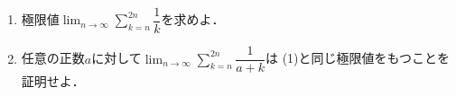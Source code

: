\documentclass[../../main.tex]{subfiles}
\begin{document}
\begin{enumerate}
  \item 極限値$\displaystyle \lim_{n \to \infty} \sum_{k=n}^{2n} \dfrac{1}{k}$を求めよ．
  \item 任意の正数$a$に対して$\displaystyle \lim_{n \to \infty} \sum_{k=n}^{2n} \dfrac{1}{a+k}$は
    (1)と同じ極限値をもつことを証明せよ．
\end{enumerate}
\end{document}
